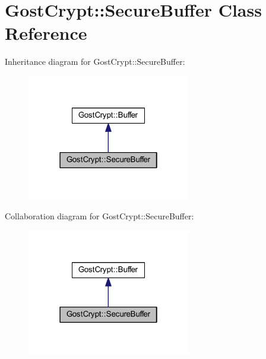 \hypertarget{class_gost_crypt_1_1_secure_buffer}{}\section{Gost\+Crypt\+:\+:Secure\+Buffer Class Reference}
\label{class_gost_crypt_1_1_secure_buffer}


Inheritance diagram for Gost\+Crypt\+:\+:Secure\+Buffer\+:
\nopagebreak
\begin{figure}[H]
\begin{center}
\leavevmode
\includegraphics[width=202pt]{class_gost_crypt_1_1_secure_buffer__inherit__graph}
\end{center}
\end{figure}


Collaboration diagram for Gost\+Crypt\+:\+:Secure\+Buffer\+:
\nopagebreak
\begin{figure}[H]
\begin{center}
\leavevmode
\includegraphics[width=202pt]{class_gost_crypt_1_1_secure_buffer__coll__graph}
\end{center}
\end{figure}
